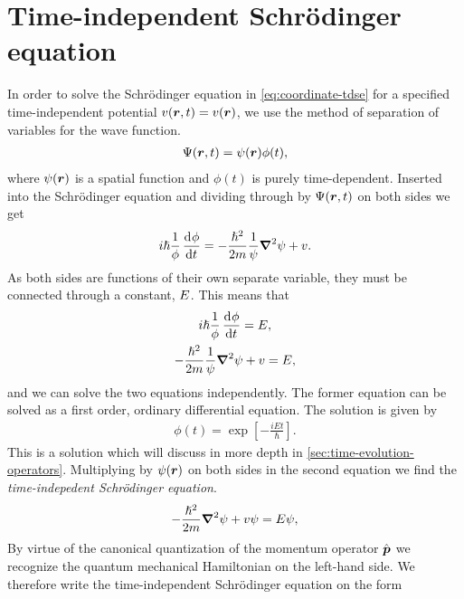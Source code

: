    \section{Time-independent Schrödinger equation}
        In order to solve the Schrödinger equation in
        \autoref{eq:coordinate-tdse} for a specified time-independent potential
        $v(\boldsymbol{r}, t) = v(\boldsymbol{r})$, we use the method of separation of
        variables for the wave function.
        \begin{align}
            \Psi(\boldsymbol{r}, t) = \psi(\boldsymbol{r})\phi(t),
        \end{align}
        where $\psi(\boldsymbol{r})$ is a spatial function and $\phi(t)$ is purely
        time-dependent.
        Inserted into the Schrödinger equation and dividing through by
        $\Psi(\boldsymbol{r}, t)$ on both sides we get
        \begin{align}
            i\hslash\frac{1}{\phi}\dod{\phi}{t}
            = -\frac{\hslash^2}{2m}\frac{1}{\psi}
            \vfg{\nabla}^2\psi + v.
        \end{align}
        As both sides are functions of their own separate variable, they must be
        connected through a constant, $E$.
        This means that
        \begin{gather}
            i\hslash\frac{1}{\phi}\dod{\phi}{t} = \energy, \\
            -\frac{\hslash^2}{2m}\frac{1}{\psi}\vfg{\nabla}^2\psi
            + v = E,
        \end{gather}
        and we can solve the two equations independently.
        The former equation can be solved as a first order, ordinary
        differential equation.
        The solution is given by
        \begin{align}
            \phi(t) = \exp[-\frac{iEt}{\hslash}].
        \end{align}
        This is a solution which will discuss in more depth in
        \autoref{sec:time-evolution-operators}.
        Multiplying by $\psi(\boldsymbol{r})$ on both sides in the second equation we
        find the \emph{time-indepedent Schrödinger equation}.
        \begin{align}
            -\frac{\hslash^2}{2m}\boldsymbol{\nabla}^2\psi + v\psi = E\psi,
        \end{align}
        By virtue of the canonical quantization of the momentum operator
        $\hat{\boldsymbol{p}}$ we recognize the quantum mechanical Hamiltonian on the
        left-hand side.
        We therefore write the time-independent Schrödinger equation on the form
